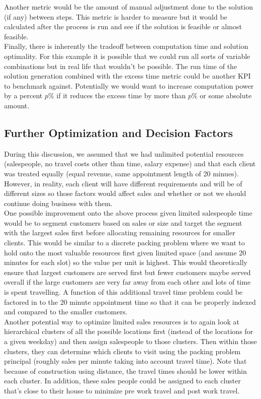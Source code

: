 \documentclass{article}
\begin{document}
Another metric would be the amount of manual adjustment done to the solution (if any) between steps.  This metric is harder to measure but it would be calculated after the process is run and see if the solution is feasible or almost feasible.\\

Finally, there is inherently the tradeoff between computation time and solution optimality.  For this example it is possible that we could run all sorts of variable combinations but in real life that wouldn't be possible.  The run time of the solution generation combined with the excess time metric could be another KPI to benchmark against. Potentially we would want to increase computation power by a percent $p\%$ if it reduces the excess time by more than $p\%$ or some absolute amount.\\

\subsection{Further Optimization and Decision Factors}
During this discussion, we assumed that we had unlimited potential resources (salespeople, no travel costs other than time, salary expense) and that each client was treated equally (equal revenue, same appointment length of 20 minues).  However, in reality, each client will have different requirements and will be of different sizes so those factors would affect sales and whether or not we should continue doing business with them.\\

One possible improvement onto the above process given limited salespeople time would be to segment customers based on sales or size and target the segment with the largest sales first before allocating remaining resources for smaller clients.  This would be similar to a discrete packing problem where we want to hold onto the most valuable resources first given limited space (and assume 20 minutes for each slot) so the value per unit is highest. This would theoretically ensure that largest customers are served first but fewer customers maybe served overall if the large customers are very far away from each other and lots of time is spent travelling.  A function of this additional travel time problem could be factored in to the 20 minute appointment time so that it can be properly indexed and compared to the smaller customers.\\

Another potential way to optimize limited sales resources is to again look at hierarchical clusters of all the possible locations first (instead of the locations for a given weekday) and then assign salespeople to those clusters.  Then within those clusters, they can determine which clients to visit using the packing problem principal (roughly sales per minute taking into account travel time).  Note that because of construction using distance, the travel times should be lower within each cluster.  In addition, these sales people could be assigned to each cluster that's close to their house to minimize pre work travel and post work travel.\\ 
\end{document}
